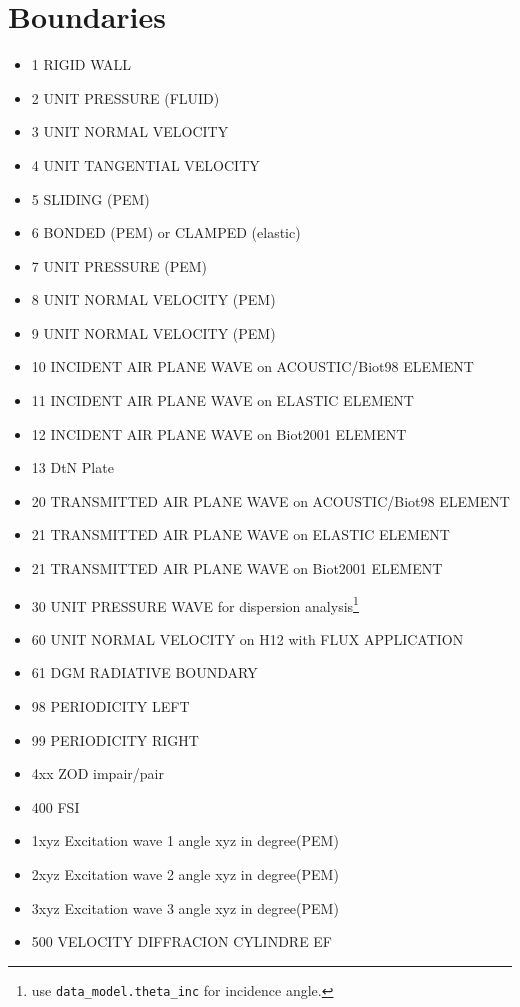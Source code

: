 \documentclass[a4paper, 13pt]{article}
\begin{document}
\Large

\section{Boundaries}

\begin{itemize}
\item 1 RIGID WALL
\item 2 UNIT PRESSURE (FLUID)
\item 3 UNIT NORMAL VELOCITY
\item 4 UNIT TANGENTIAL VELOCITY
\item 5 SLIDING (PEM)
\item 6 BONDED (PEM) or CLAMPED (elastic)
\item 7 UNIT PRESSURE (PEM)
\item 8 UNIT NORMAL VELOCITY (PEM)
\item 9 UNIT NORMAL VELOCITY (PEM)
\item 10 INCIDENT AIR PLANE WAVE on  ACOUSTIC/Biot98  ELEMENT 
\item 11 INCIDENT AIR PLANE WAVE on ELASTIC ELEMENT 
\item 12 INCIDENT AIR PLANE WAVE on Biot2001 ELEMENT
\item 13 DtN Plate
\item 20 TRANSMITTED AIR PLANE WAVE on  ACOUSTIC/Biot98  ELEMENT 
\item 21 TRANSMITTED AIR PLANE WAVE on ELASTIC ELEMENT 
\item 21 TRANSMITTED AIR PLANE WAVE on Biot2001 ELEMENT
\item 30 UNIT PRESSURE WAVE for dispersion analysis\footnote{use \texttt{data\_model.theta\_inc} for incidence angle.}
\item 60 UNIT NORMAL VELOCITY on H12 with FLUX APPLICATION
\item 61 DGM RADIATIVE BOUNDARY
\item 98 PERIODICITY LEFT
\item 99 PERIODICITY RIGHT
\item 4xx ZOD impair/pair
\item 400 FSI
\item 1xyz Excitation wave 1 angle xyz in degree(PEM)
\item 2xyz Excitation wave 2 angle xyz in degree(PEM)
\item 3xyz Excitation wave 3 angle xyz in degree(PEM)
\item 500 VELOCITY DIFFRACION CYLINDRE EF
\end{itemize}
\end{document}
